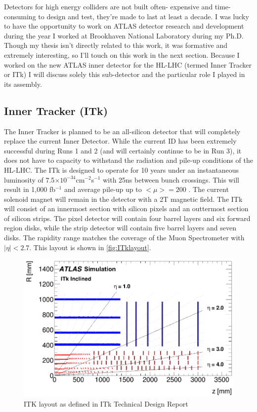 Detectors for high energy colliders are not built often- expensive and time-consuming to design and test, they're made to last at least a decade. I was lucky to have the opportunity to work on ATLAS detector research and development during the year I worked at Brookhaven National Laboratory during my Ph.D. Though my thesis isn't directly related to this work, it was formative and extremely interesting, so I'll touch on this work in the next section. Because I worked on the new ATLAS inner detector for the HL-LHC (termed Inner Tracker or ITk) I will discuss solely this sub-detector and the particular role I played in its assembly.

\subsection{Inner Tracker (ITk)}
The Inner Tracker is planned to be an all-silicon detector that will completely replace the current Inner Detector.  While the current ID has been extremely successful during Runs 1 and 2 (and will certainly continue to be in Run 3), it does not have to capacity to withstand the radiation and pile-up conditions of the HL-LHC. The ITk is designed to operate for 10 years under an instantaneous luminosity of 7.5$\times10^{-34}$cm$^{-2}$s$^{-1}$ with 25ns between bunch crossings. This will result in 1,000 fb$^{-1}$ and average pile-up up to $<\mu>=200$ \cite{ITktech}. The current solenoid magnet will remain in the detector with a 2T magnetic field. The ITk will consist of an innermost section with silicon pixels and an outtermost section of silicon strips. The pixel detector will contain four barrel layers and six forward region disks, while the strip detector will contain five barrel layers and seven disks. The rapidity range matches the coverage of the Muon Spectrometer with $|\eta|<2.7$. This layout is shown in \ref{fig:ITklayout}. 
\begin{figure}[!h]
        \centering
    \includegraphics[width=.6\textwidth]{Pictures/ITklayout.png}
    \caption{ ITK layout as defined in ITk Technical Design Report \cite{ITktech}}
    \label{fig:ITKlayout}
\end{figure}

